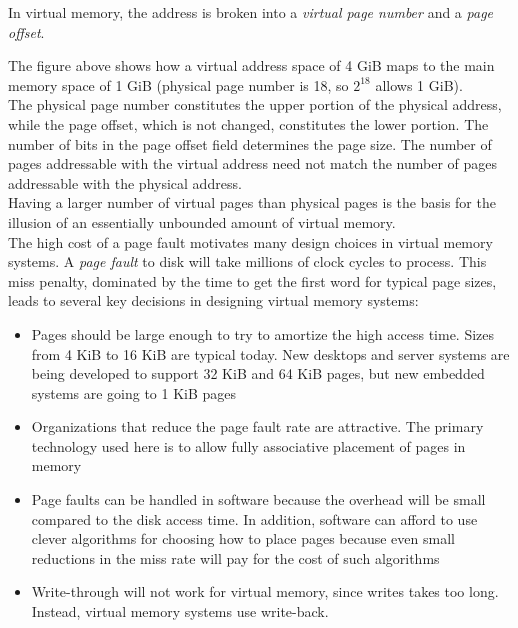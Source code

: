 \documentclass[12pt]{article}
\theoremstyle{definition}
\begin{document}
  In virtual memory, the address is broken into a \emph{virtual page number} and a \emph{page offset}.

  \begin{figure}[H]
  \end{figure}

  The figure above shows how a virtual address space of 4 GiB maps to the main memory space of 1 GiB (physical page number is 18, so $2^{18}$ allows 1 GiB). \\
  The physical page number constitutes the upper portion of the physical address, while the page offset, which is not changed, constitutes the lower portion.
  The number of bits in the page offset field determines the page size.
  The number of pages addressable with the virtual address need not match the number of pages addressable with the physical address. \\
  Having a larger number of virtual pages than physical pages is the basis for the illusion of an essentially unbounded amount of virtual memory. \\

  The high cost of a page fault motivates many design choices in virtual memory systems.
  A \emph{page fault} to disk will take millions of clock cycles to process.
  This miss penalty, dominated by the time to get the first word for typical page sizes, leads to several key decisions in designing virtual memory systems:
  \begin{itemize}
    \item Pages should be large enough to try to amortize the high access time.
    Sizes from 4 KiB to 16 KiB are typical today.
    New desktops and server systems are being developed to support 32 KiB and 64 KiB pages, but new embedded systems are going to 1 KiB pages
    \item Organizations that reduce the page fault rate are attractive.
    The primary technology used here is to allow fully associative placement of pages in memory
    \item Page faults can be handled in software because the overhead will be small compared to the disk access time.
    In addition, software can afford to use clever algorithms for choosing how to place pages because even small reductions in the miss rate will pay for the cost of such algorithms
    \item Write-through will not work for virtual memory, since writes takes too long.
    Instead, virtual memory systems use write-back.
  \end{itemize}
\end{document}
